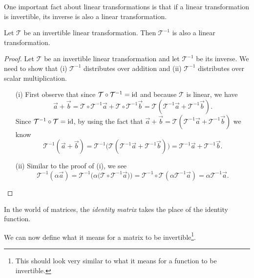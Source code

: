 One important fact about linear transformations is that if a linear transformation is invertible,
its inverse is also a linear transformation.
\begin{theorem}
	Let $\mathcal T$ be an invertible linear transformation. Then $\mathcal T^{-1}$ is also
	a linear transformation.
\end{theorem}
\begin{proof}
	Let $\mathcal T$ be an invertible linear transformation and let $\mathcal T^{-1}$ be its inverse.
	We need to show that (i) $\mathcal T^{-1}$ distributes over addition and (ii) $\mathcal T^{-1}$
	distributes over scalar multiplication.
	\begin{enumerate}
		\item[(i)] First observe that since $\mathcal T\circ \mathcal T^{-1}=\operatorname{\operatorname{id}}$ and because $\mathcal T$ is linear, we have
		\[
			\vec a+\vec b = \mathcal T\circ \mathcal T^{-1}\vec a+\mathcal T\circ \mathcal T^{-1}\vec b=
			\mathcal T(\mathcal T^{-1}\vec a+ \mathcal T^{-1}\vec b).
		\]
		Since $\mathcal T^{-1}\circ \mathcal T=\operatorname{\operatorname{id}}$, by using the fact that
			$\vec a+\vec b=\mathcal T(\mathcal T^{-1}\vec a+ \mathcal T^{-1}\vec b)$ we know
		\[
			\mathcal T^{-1}(\vec a+\vec b) = 
			\mathcal T^{-1}\Big(\mathcal T(\mathcal T^{-1}\vec a+ \mathcal T^{-1}\vec b)\Big)=
			\mathcal T^{-1}\vec a+ \mathcal T^{-1}\vec b.
		\]
		\item[(ii)] Similar to the proof of (i), we see
		\[
			\mathcal T^{-1}(\alpha\vec a) = \mathcal T^{-1}\Big(\alpha \big(\mathcal T\circ \mathcal T^{-1}\vec a\big)\Big)
			=\mathcal T^{-1}\circ \mathcal T(\alpha \mathcal T^{-1}\vec a) = \alpha\mathcal T^{-1}\vec a.
		\]
	\end{enumerate}
\end{proof}


In the world of matrices, the \emph{identity matrix} takes the place of the identity function.


We can now define what it means for a matrix to be invertible\footnote{ This should look very similar to what it means
for a function to be invertible.}.


